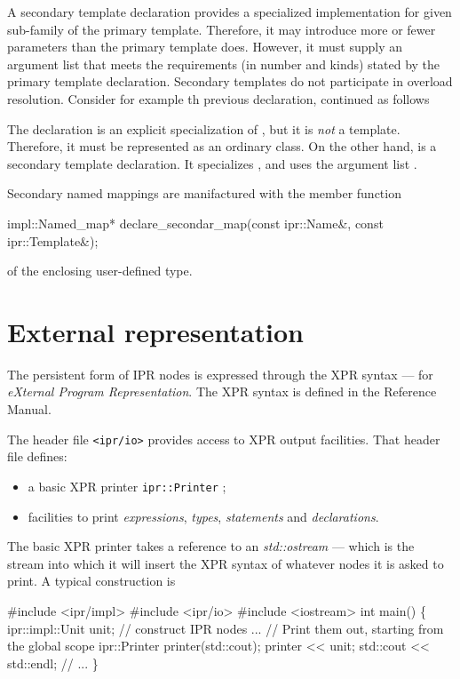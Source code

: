 \documentclass[11pt]{article}
\begin{document}
A secondary template declaration provides a specialized implementation for 
given sub-family of the primary template.  Therefore, it may introduce
more or fewer parameters than the primary template does.  However, it must
supply an argument list that meets the requirements (in number and kinds)
stated by the primary template declaration. Secondary templates do not
participate in overload resolution. Consider for example th previous
 declaration, continued as follows
The declaration  is an explicit specialization of
, but it is \emph{not} a template.  Therefore, it must be
represented as an ordinary class.  On the other hand,  is a
secondary template declaration.  It specializes , and uses the 
argument list .

Secondary named mappings are manifactured with the member function
\begin{Program}
  impl::Named_map* declare_secondar_map(const ipr::Name&, const ipr::Template&);
\end{Program}
of the enclosing user-defined type.

\section{External representation}
\label{sec:xpr}

The persistent form of IPR nodes is expressed through the 
XPR syntax --- for \emph{eXternal Program Representation}.  The XPR syntax is
defined in the Reference Manual.  

The header file \texttt{<ipr/io>} provides access to XPR output 
facilities.  That header file defines:
\begin{itemize}
\item a basic XPR printer \texttt{ipr::Printer} ;
\item facilities to print \emph{expressions}, \emph{types}, \emph{statements}
  and \emph{declarations}.  
\end{itemize}

The basic XPR printer takes a reference to an \emph{std::ostream} --- which is
the stream into which it will insert the XPR syntax of whatever nodes it is
asked to print.  A typical construction is 
\begin{Program}
  \#include <ipr/impl>
  \#include <ipr/io>
  \#include <iostream>
  int main() 
  \{
      ipr::impl::Unit unit;
      // construct IPR nodes ...
      // Print them out, starting from the global scope
      ipr::Printer printer(std::cout);
      printer << unit;
      std::cout << std::endl;
      // ...
  \}
\end{Program}



\end{document}
